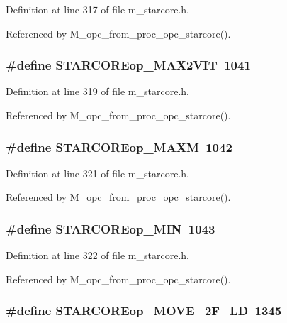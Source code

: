 Definition at line 317 of file m\_\-starcore.h.

Referenced by M\_\-opc\_\-from\_\-proc\_\-opc\_\-starcore().
\subsubsection{\setlength{\rightskip}{0pt plus 5cm}\#define STARCOREop\_\-MAX2VIT~1041}\label{m__starcore_8h_6d692bab4e4c07cbaad02be9aae6d586}




Definition at line 319 of file m\_\-starcore.h.

Referenced by M\_\-opc\_\-from\_\-proc\_\-opc\_\-starcore().
\subsubsection{\setlength{\rightskip}{0pt plus 5cm}\#define STARCOREop\_\-MAXM~1042}\label{m__starcore_8h_ae35271945015cab691e68f50964daed}




Definition at line 321 of file m\_\-starcore.h.

Referenced by M\_\-opc\_\-from\_\-proc\_\-opc\_\-starcore().
\subsubsection{\setlength{\rightskip}{0pt plus 5cm}\#define STARCOREop\_\-MIN~1043}\label{m__starcore_8h_abdd1d3fd22da05f787534151c612138}




Definition at line 322 of file m\_\-starcore.h.

Referenced by M\_\-opc\_\-from\_\-proc\_\-opc\_\-starcore().
\subsubsection{\setlength{\rightskip}{0pt plus 5cm}\#define STARCOREop\_\-MOVE\_\-2F\_\-LD~1345}\label{m__starcore_8h_963c72b69c5b646ce7342027525ca82b}





